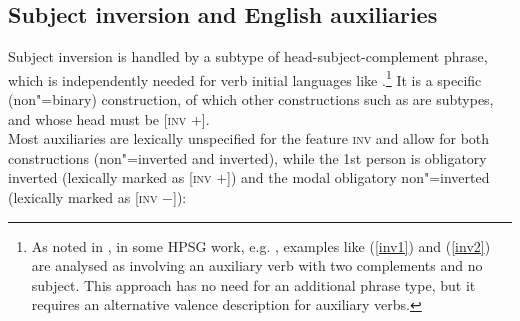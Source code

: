 \eal
\settowidth{}
 \label{inv1}
\label{inv2}
\zl

\subsection{Subject inversion and English auxiliaries}

Subject inversion is handled by a subtype of head-subject-complement phrase, which is independently
needed for verb initial languages like  \parencites[]{Borsley99c-u}[]{SWB2003a}.\footnote{As
  noted in \crossrefchapterw[\page \pageref{page-properties:aux-inversion}]{properties}, in some HPSG work, e.g. ,
  examples like (\ref{inv1}) and (\ref{inv2}) are analysed as involving an auxiliary verb with two
  complements and no subject. This approach has no need for an additional phrase type, but it
  requires an alternative valence description for auxiliary verbs.} It is a specific (non"=binary)
construction, of which other constructions such as  are subtypes,
and whose head must be [\textsc{inv} $+$].
\ea
{} \impl\\
\z
Most auxiliaries are lexically unspecified for the feature \textsc{inv} and allow for both constructions
(non"=inverted and inverted), while the 1st person  is obligatory inverted (lexically
marked as [\textsc{inv} $+$]) and the modal  obligatory non"=inverted (lexically marked
as [\textsc{inv} $-$]):

